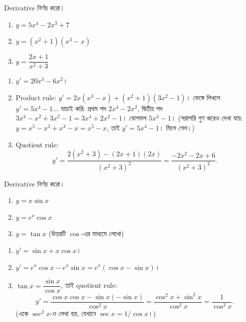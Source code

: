 \documentclass[11pt]{article}
\begin{document}
 Derivative নির্ণয় করো।
\begin{enumerate}
  \item $y = 5x^{4} - 2x^{3} + 7$
  \item $y = \left( x^{2}+1 \right)\left( x^{3}-x \right)$
  \item $y = \dfrac{2x+1}{x^{2}+3}$
\end{enumerate}

\begin{sol}
\begin{enumerate}
  \item $y' = 20x^{3} - 6x^{2}$।
  \item Product rule: $y' = 2x\left( x^{3}-x \right)
        + \left( x^{2}+1 \right)\left( 3x^{2}-1 \right)$।
        ভেঙ্গে লিখলে $y' = 5x^{4} - 1$... যাচাই করি: প্রথম পদ
        $2x^{4}-2x^{2}$, দ্বিতীয় পদ $3x^{4}-x^{2}+3x^{2}-1 = 3x^{4}+2x^{2}-1$। 
        যোগফল $5x^{4} - 1$। (সরাসরি গুণ করেও দেখা যায়:
        $y = x^{5}-x^{3}+x^{3}-x = x^{5}-x$, তাই $y' = 5x^{4}-1$। মিলে গেল।)
  \item Quotient rule:
        \[
          y' = \frac{2\left( x^{2}+3 \right) - (2x+1)(2x)}{\left( x^{2}+3
          \right)^{2}}
          = \frac{-2x^{2} - 2x + 6}{\left( x^{2}+3 \right)^{2}} .
        \]
\end{enumerate}
\end{sol}

 Derivative নির্ণয় করো।
\begin{enumerate}
  \item $y = x\sin x$
  \item $y = e^{x}\cos x$
  \item $y = \tan x$ (উত্তরটি $\cos$-এর মাধ্যমে লেখো)
\end{enumerate}

\begin{sol}
\begin{enumerate}
  \item $y' = \sin x + x\cos x$।
  \item $y' = e^{x}\cos x - e^{x}\sin x = e^{x}\left( \cos x - \sin x \right)$।
  \item $\tan x = \dfrac{\sin x}{\cos x}$, তাই quotient rule:
        \[
          y' = \frac{\cos x\cos x - \sin x\left( -\sin x \right)}{\cos^{2}x}
          = \frac{\cos^{2}x + \sin^{2}x}{\cos^{2}x} = \frac{1}{\cos^{2}x} .
        \]
        (একে $\sec^{2}x$-ও লেখা হয়, যেখানে $\sec x = 1/\cos x$।)
\end{enumerate}
\end{sol}
\end{document}
